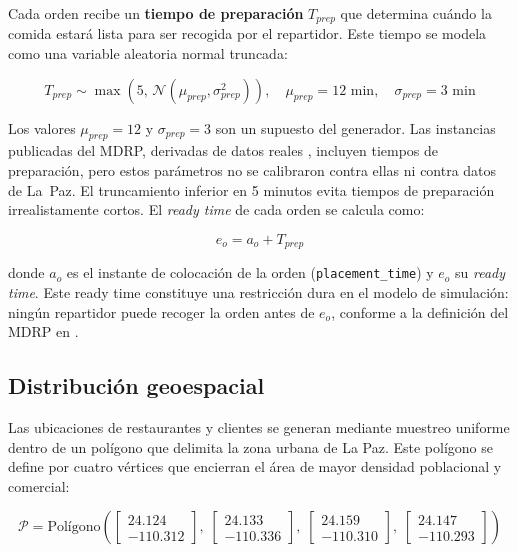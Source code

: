 \documentclass[12pt,letterpaper,oneside]{book}
\begin{document}
	Cada orden recibe un \textbf{tiempo de preparación} $T_{prep}$ que determina cuándo la comida 
	estará lista para ser recogida por el repartidor. Este tiempo se modela como una variable aleatoria 
	normal truncada:

	\begin{equation}
		T_{prep} \sim \max\!\left(5, \, \mathcal{N}(\mu_{prep}, \sigma_{prep}^2)\right), 
		\quad \mu_{prep} = 12 \text{ min}, \quad \sigma_{prep} = 3 \text{ min}
		\label{eq:prep_time}
	\end{equation}

	Los valores $\mu_{prep} = 12$ y $\sigma_{prep} = 3$ son un supuesto del generador. Las instancias
	publicadas del MDRP, derivadas de datos reales \citep{Reyes2018, Yildiz2019MealDelivery}, incluyen
	tiempos de preparación, pero estos parámetros no se calibraron contra ellas ni contra datos de
	La~Paz. El truncamiento inferior en 5 minutos evita tiempos de
	preparación irrealistamente cortos. El \textit{ready time} de cada orden se calcula como:

	\begin{equation}
		e_o = a_o + T_{prep}
	\end{equation}

	\noindent donde $a_o$ es el instante de colocación de la orden
	(\texttt{placement\_time}) y $e_o$ su \textit{ready time}. Este ready time constituye una restricción dura en el modelo de simulación: ningún repartidor puede
	recoger la orden antes de $e_o$, conforme a la definición del MDRP en 
	\citet{Reyes2018}.

	\subsection{Distribución geoespacial}

	Las ubicaciones de restaurantes y clientes se generan mediante muestreo uniforme
	dentro de un polígono que delimita la zona urbana de La Paz. Este polígono se define por 
	cuatro vértices que encierran el área de mayor densidad poblacional y comercial:

	\begin{equation}
		\mathcal{P} = \text{Polígono}\left(
		\begin{bmatrix} 24.124 \\ -110.312 \end{bmatrix},\;
		\begin{bmatrix} 24.133 \\ -110.336 \end{bmatrix},\;
		\begin{bmatrix} 24.159 \\ -110.310 \end{bmatrix},\;
		\begin{bmatrix} 24.147 \\ -110.293 \end{bmatrix}
		\right)
	\end{equation}
\end{document}
